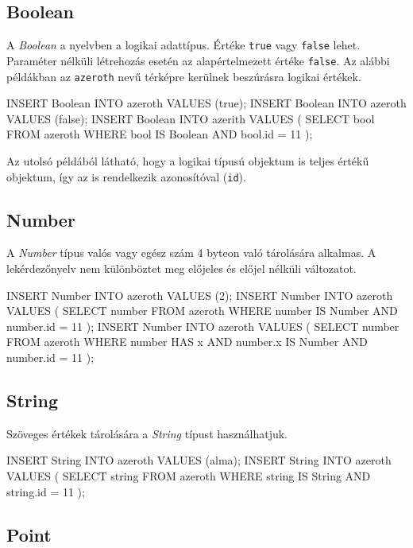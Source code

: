 \subsection{Boolean}

A \textit{Boolean} a nyelvben a logikai adattípus. Értéke \texttt{true} vagy \texttt{false} lehet. Paraméter nélküli létrehozás esetén az alapértelmezett értéke \texttt{false}. Az alábbi példákban az \texttt{azeroth} nevű térképre kerülnek beszúrásra logikai értékek.

\begin{sql}
INSERT Boolean INTO azeroth VALUES (true);
INSERT Boolean INTO azeroth VALUES (false);
INSERT Boolean INTO azerith VALUES (
    { SELECT bool FROM azeroth
      WHERE bool IS Boolean AND bool.id = 11 }
);
\end{sql}

Az utolsó példából látható, hogy a logikai típusú objektum is teljes értékű objektum, így az is rendelkezik azonosítóval (\texttt{id}).

\subsection{Number}

A \textit{Number} típus valós vagy egész szám 4 byteon való tárolására alkalmas. A lekérdezőnyelv nem különböztet meg előjeles és előjel nélküli változatot.

\begin{sql}
INSERT Number INTO azeroth VALUES (2);
INSERT Number INTO azeroth VALUES (
    { SELECT number FROM azeroth
      WHERE number IS Number AND number.id = 11 }
);
INSERT Number INTO azeroth VALUES (
    { SELECT number FROM azeroth
      WHERE number HAS x AND number.x IS Number AND number.id = 11 }
);
\end{sql}

\subsection{String}

Szöveges értékek tárolására a \textit{String} típust használhatjuk.

\begin{sql}
INSERT String INTO azeroth VALUES (alma);
INSERT String INTO azeroth VALUES (
    { SELECT string FROM azeroth
      WHERE string IS String AND string.id = 11 }
);
\end{sql}

\subsection{Point}

